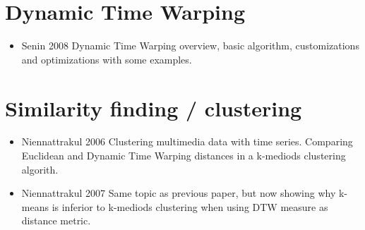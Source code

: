 \section{Dynamic Time Warping}
\begin{itemize}
    \item Senin 2008 \citep{Senin2008} Dynamic Time Warping overview, basic algorithm, customizations and optimizations with some examples.
\end{itemize}

\section{Similarity finding / clustering}
\begin{itemize}
    \item Niennattrakul 2006 \citep{Niennattrakul2006} Clustering multimedia data with time series. Comparing Euclidean and Dynamic Time Warping distances in a k-mediods clustering algorith.
    \item Niennattrakul 2007 \citep{Niennattrakul2007} Same topic as previous paper, but now showing why k-means is inferior to k-mediods clustering when using DTW measure as distance metric.
\end{itemize}

